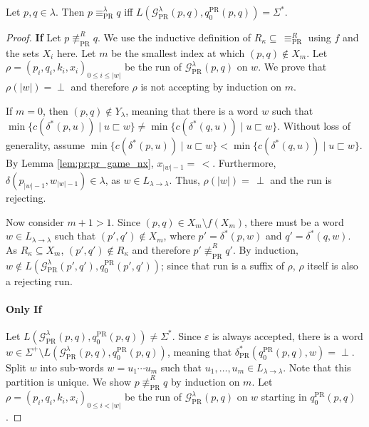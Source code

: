 \begin{theorem}
	Let $p, q \in \lambda$. Then $p \equiv_\text{PR}^\lambda q$ iff $L(\mathcal{G}_\text{PR}^\lambda(p, q), q_0^\text{PR}(p, q)) = \Sigma^*$.
\end{theorem}

\begin{proof}
	\textbf{If } Let $p \not\equiv_\text{PR}^R q$. We use the inductive definition of $R_\kappa \subseteq\, \equiv_\text{PR}^R$ using $f$ and the sets $X_i$ here. Let $m$ be the smallest index at which $(p, q) \notin X_m$. Let $\rho = (p_i, q_i, k_i, x_i)_{0 \leq i \leq |w|}$ be the run of $\mathcal{G}_\text{PR}^\lambda(p, q)$ on $w$. We prove that $\rho(|w|) = \perp$ and therefore $\rho$ is not accepting by induction on $m$.
	
	If $m = 0$, then $(p, q) \notin Y_\lambda$, meaning that there is a word $w$ such that $\min \{ c(\delta^*(p, u)) \mid u \sqsubset w \} \neq \min \{ c(\delta^*(q, u)) \mid u \sqsubset w \}$. Without loss of generality, assume $\min \{ c(\delta^*(p, u)) \mid u \sqsubset w \} < \min \{ c(\delta^*(q, u)) \mid u \sqsubset w \}$. By Lemma \ref{lem:pr:pr_game_nx}, $x_{|w|-1} =\, <$. Furthermore, $\delta(p_{|w|-1}, w_{|w|-1}) \in \lambda$, as $w \in L_{\lambda \rightarrow \lambda}$. Thus, $\rho(|w|) =\, \perp$ and the run is rejecting.
	
	Now consider $m+1 > 1$. Since $(p, q) \in X_m \setminus f(X_m)$, there must be a word $w \in L_{\lambda \rightarrow \lambda}$ such that $(p', q') \notin X_m$, where $p' = \delta^*(p, w)$ and $q' = \delta^*(q, w)$. As $R_\kappa \subseteq X_m$, $(p', q') \notin R_\kappa$ and therefore $p' \not\equiv_\text{PR}^R q'$. By induction, $w \notin L(\mathcal{G}_\text{PR}^\lambda(p', q'), q_0^\text{PR}(p', q'))$; since that run is a suffix of $\rho$, $\rho$ itself is also a rejecting run.
	
	\paragraph{Only If} Let $L(\mathcal{G}_\text{PR}^\lambda(p, q), q_0^\text{PR}(p, q)) \neq \Sigma^*$. Since $\varepsilon$ is always accepted, there is a word $w \in \Sigma^+ \setminus L(\mathcal{G}_\text{PR}^\lambda(p, q), q_0^\text{PR}(p, q))$, meaning that $\delta_\text{PR}^*(q_0^\text{PR}(p, q), w) = \perp$. Split $w$ into sub-words $w = u_1 \cdots u_m$ such that $u_1, \dots, u_m \in L_{\lambda \rightarrow \lambda}$. Note that this partition is unique. We show $p \not\equiv_\text{PR}^R q$ by induction on $m$. Let $\rho = (p_i, q_i, k_i, x_i)_{0 \leq i < |w|}$ be the run of $\mathcal{G}_\text{PR}^\lambda(p, q)$ on $w$ starting in $q_0^\text{PR}(p, q)$.
	

\end{proof}
